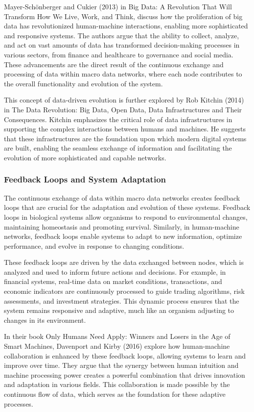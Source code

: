\documentclass[12pt,twoside]{article}
\begin{document}
Mayer-Schönberger and Cukier (2013) in Big Data: A Revolution That Will Transform How We Live, Work, and Think, discuss how the proliferation of big data has revolutionized human-machine interactions, enabling more sophisticated and responsive systems. The authors argue that the ability to collect, analyze, and act on vast amounts of data has transformed decision-making processes in various sectors, from finance and healthcare to governance and social media. These advancements are the direct result of the continuous exchange and processing of data within macro data networks, where each node contributes to the overall functionality and evolution of the system.

This concept of data-driven evolution is further explored by Rob Kitchin (2014) in The Data Revolution: Big Data, Open Data, Data Infrastructures and Their Consequences. Kitchin emphasizes the critical role of data infrastructures in supporting the complex interactions between humans and machines. He suggests that these infrastructures are the foundation upon which modern digital systems are built, enabling the seamless exchange of information and facilitating the evolution of more sophisticated and capable networks.

\subsubsection{Feedback Loops and System Adaptation}

The continuous exchange of data within macro data networks creates feedback loops that are crucial for the adaptation and evolution of these systems. Feedback loops in biological systems allow organisms to respond to environmental changes, maintaining homeostasis and promoting survival. Similarly, in human-machine networks, feedback loops enable systems to adapt to new information, optimize performance, and evolve in response to changing conditions.

These feedback loops are driven by the data exchanged between nodes, which is analyzed and used to inform future actions and decisions. For example, in financial systems, real-time data on market conditions, transactions, and economic indicators are continuously processed to guide trading algorithms, risk assessments, and investment strategies. This dynamic process ensures that the system remains responsive and adaptive, much like an organism adjusting to changes in its environment.

In their book Only Humans Need Apply: Winners and Losers in the Age of Smart Machines, Davenport and Kirby (2016) explore how human-machine collaboration is enhanced by these feedback loops, allowing systems to learn and improve over time. They argue that the synergy between human intuition and machine processing power creates a powerful combination that drives innovation and adaptation in various fields. This collaboration is made possible by the continuous flow of data, which serves as the foundation for these adaptive processes.
\end{document}
